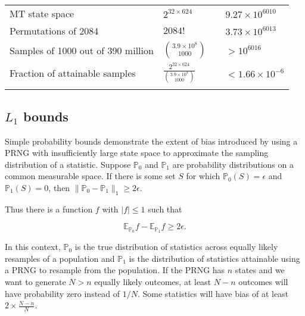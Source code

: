 \documentclass[graybox]{svmult}
\begin{document}
\begin{table}
\begin{tabular}[h]{p{4cm}p{2.4cm}p{4cm}p{2cm}}
MT state space & $2^{32 \times 624}$ & & $9.27\times 10^{6010}$ \\
Permutations of 2084 & $2084!$ &   & $3.73 \times 10^{6013}$ \\
Samples of 1000 out of 390 million & ${3.9\times 10^8 \choose 1000}$ & & $> 10^{6016}$ \\
Fraction of attainable samples & $\frac{2^{32 \times 624}}{{3.9\times 10^8 \choose 1000}}$ &  & $< 1.66 \times 10^{-6}$ \\
\noalign{\smallskip}\svhline\noalign{\smallskip}
\end{tabular}
\end{table}





\subsection{$L_1$ bounds}\label{sec:L1bounds}

Simple probability bounds demonstrate the extent of bias introduced by using a PRNG with insufficiently large
state space to approximate the sampling distribution of a statistic.
Suppose ${\mathbb P}_0$ and ${\mathbb P}_1$ are probability distributions on a common measurable space. 
If there is some set $S$ for which ${\mathbb P}_0(S) = \epsilon$ and ${\mathbb P}_1(S) = 0$, then $\|{\mathbb P}_0 - {\mathbb P}_1 \|_1 \ge 2 \epsilon$.

Thus there is a function $f$ with $|f| \le 1$ such that 

$${\mathbb E}_{{\mathbb P}_0}f -  {\mathbb E}_{{\mathbb P}_1}f \ge 2 \epsilon.$$

In this context, ${\mathbb P}_0$ is the true distribution of statistics across equally likely resamples of a population 
and ${\mathbb P}_1$ is the distribution of statistics attainable using a PRNG to resample from the population.
If the PRNG has $n$ states and we want to generate $N>n$ equally likely outcomes, at least $N-n$ outcomes will have probability zero instead of $1/N$.
Some statistics will have bias of at least $2 \times \frac{N-n}{N}$.
\end{document}

